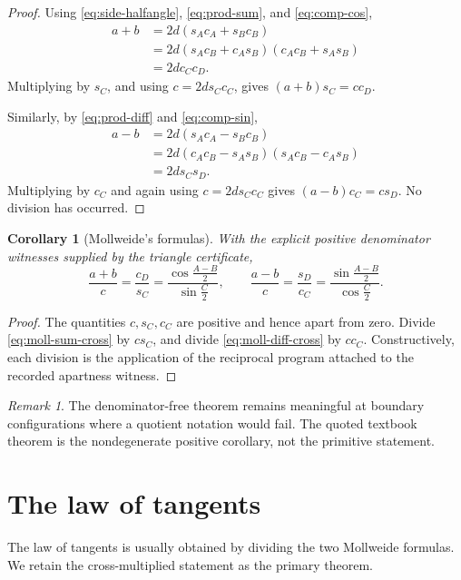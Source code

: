 \documentclass[11pt,letterpaper]{article}
\newtheorem{corollary}[theorem]{Corollary}
\theoremstyle{definition}
\theoremstyle{remark}
\newtheorem{remark}[theorem]{Remark}
\begin{document}
\begin{proof}
Using \eqref{eq:side-halfangle}, \eqref{eq:prod-sum}, and
\eqref{eq:comp-cos},
\begin{align*}
 a+b
 &=2d(s_Ac_A+s_Bc_B)\\
 &=2d(s_Ac_B+c_As_B)(c_Ac_B+s_As_B)\\
 &=2d c_Cc_D.
\end{align*}
Multiplying by \(s_C\), and using \(c=2d s_Cc_C\), gives
\((a+b)s_C=cc_D\).

Similarly, by \eqref{eq:prod-diff} and \eqref{eq:comp-sin},
\begin{align*}
 a-b
 &=2d(s_Ac_A-s_Bc_B)\\
 &=2d(c_Ac_B-s_As_B)(s_Ac_B-c_As_B)\\
 &=2d s_Cs_D.
\end{align*}
Multiplying by \(c_C\) and again using \(c=2d s_Cc_C\) gives
\((a-b)c_C=cs_D\).  No division has occurred.
\end{proof}

\begin{corollary}[Mollweide's formulas]
\label{cor:mollweide}
With the explicit positive denominator witnesses supplied by the triangle
certificate,
\[
 \frac{a+b}{c}=\frac{c_D}{s_C}
 =\frac{\cos\frac{A-B}{2}}{\sin\frac C2},
 \qquad
 \frac{a-b}{c}=\frac{s_D}{c_C}
 =\frac{\sin\frac{A-B}{2}}{\cos\frac C2}.
 \tag{4.6}\label{eq:mollweide-quotient}
\]
\end{corollary}

\begin{proof}
The quantities \(c,s_C,c_C\) are positive and hence apart from zero.  Divide
\eqref{eq:moll-sum-cross} by \(cs_C\), and divide
\eqref{eq:moll-diff-cross} by \(cc_C\).  Constructively, each division is the
application of the reciprocal program attached to the recorded apartness
witness.
\end{proof}

\begin{remark}
The denominator-free theorem remains meaningful at boundary configurations
where a quotient notation would fail.  The quoted textbook theorem is the
nondegenerate positive corollary, not the primitive statement.
\end{remark}

\section{The law of tangents}
\label{sec:tangents}

The law of tangents is usually obtained by dividing the two Mollweide
formulas.  We retain the cross-multiplied statement as the primary theorem.
\end{document}
